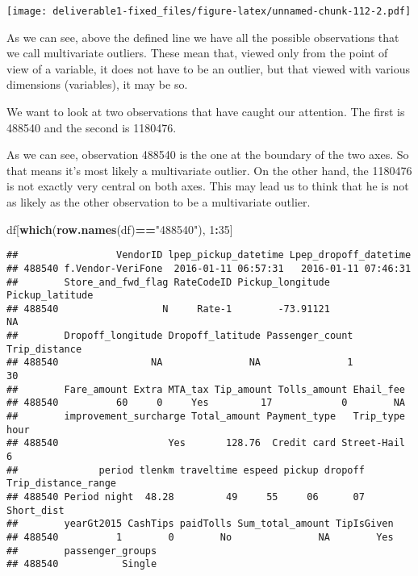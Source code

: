 \documentclass[
  18pt,
  a4paper]{article}
\newenvironment{Shaded}{\begin{snugshade}}{\end{snugshade}}
\newcommand{\DecValTok}[1]{\textcolor[rgb]{0.00,0.00,0.81}{#1}}
\newcommand{\KeywordTok}[1]{\textcolor[rgb]{0.13,0.29,0.53}{\textbf{#1}}}
\newcommand{\NormalTok}[1]{#1}
\newcommand{\OperatorTok}[1]{\textcolor[rgb]{0.81,0.36,0.00}{\textbf{#1}}}
\newcommand{\StringTok}[1]{\textcolor[rgb]{0.31,0.60,0.02}{#1}}
\begin{document}
\texttt{[image: deliverable1-fixed\_files/figure-latex/unnamed-chunk-112-2.pdf]}

As we can see, above the defined line we have all the possible
observations that we call multivariate outliers. These mean that, viewed
only from the point of view of a variable, it does not have to be an
outlier, but that viewed with various dimensions (variables), it may be
so.

We want to look at two observations that have caught our attention. The
first is 488540 and the second is 1180476.

As we can see, observation 488540 is the one at the boundary of the two
axes. So that means it's most likely a multivariate outlier. On the
other hand, the 1180476 is not exactly very central on both axes. This
may lead us to think that he is not as likely as the other observation
to be a multivariate outlier.

\begin{Shaded}
\begin{Highlighting}[]
\NormalTok{df[}\KeywordTok{which}\NormalTok{(}\KeywordTok{row.names}\NormalTok{(df)}\OperatorTok{==}\StringTok{"488540"}\NormalTok{), }\DecValTok{1}\OperatorTok{:}\DecValTok{35}\NormalTok{]}
\end{Highlighting}
\end{Shaded}

\begin{verbatim}
##                 VendorID lpep_pickup_datetime Lpep_dropoff_datetime
## 488540 f.Vendor-VeriFone  2016-01-11 06:57:31   2016-01-11 07:46:31
##        Store_and_fwd_flag RateCodeID Pickup_longitude Pickup_latitude
## 488540                  N     Rate-1        -73.91121              NA
##        Dropoff_longitude Dropoff_latitude Passenger_count Trip_distance
## 488540                NA               NA               1            30
##        Fare_amount Extra MTA_tax Tip_amount Tolls_amount Ehail_fee
## 488540          60     0     Yes         17            0        NA
##        improvement_surcharge Total_amount Payment_type   Trip_type hour
## 488540                   Yes       128.76  Credit card Street-Hail    6
##              period tlenkm traveltime espeed pickup dropoff Trip_distance_range
## 488540 Period night  48.28         49     55     06      07          Short_dist
##        yearGt2015 CashTips paidTolls Sum_total_amount TipIsGiven
## 488540          1        0        No               NA        Yes
##        passenger_groups
## 488540           Single
\end{verbatim}
\end{document}
